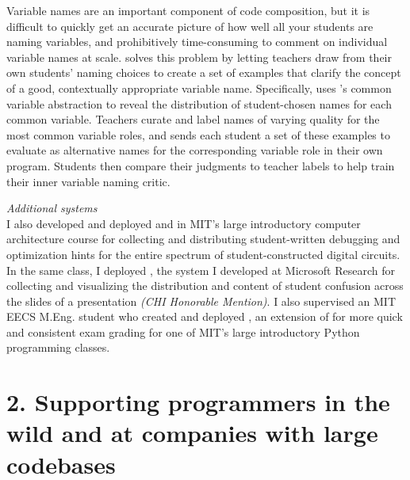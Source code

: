 \documentclass[justified]{tufte-handout}
\begin{document}
Variable names are an important component of code composition, but it is difficult to quickly get an accurate picture of how well all your students are naming variables, and prohibitively time-consuming to comment on individual variable names at scale.  solves this problem by letting teachers draw from their own students' naming choices to create a set of examples that clarify the concept of a good, contextually appropriate variable name.\cite{foobaz} Specifically,  uses 's common variable abstraction to reveal the distribution of student-chosen names for each common variable. Teachers curate and label names of varying quality for the most common variable roles, and  sends each student a set of these examples to evaluate as alternative names for the corresponding variable role in their own program. Students then compare their judgments to teacher labels to help train their inner variable naming critic. %

\newpage
\noindent
\emph{Additional systems}\\
I also developed and deployed  and  in MIT's large introductory computer architecture course for collecting and distributing student-written debugging and optimization hints for the entire spectrum of student-constructed digital circuits.\cite{cscw16} In the same class, I deployed , the system I developed at Microsoft Research for collecting and visualizing the distribution and content of student confusion across the slides of a presentation \emph{(CHI Honorable Mention)}.\cite{mudslide} I also supervised an MIT EECS M.Eng. student who created and deployed , an extension of  for more quick and consistent exam grading for one of MIT's large introductory Python programming classes.\cite{grovercode}


\section{2. Supporting programmers in the wild and at companies with large codebases}
\end{document}
